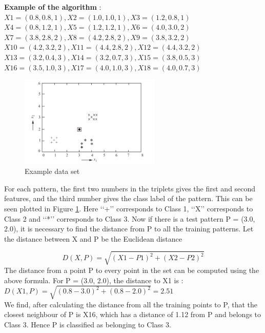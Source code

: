 \vspace{5mm}
\textbf{Example of the algorithm} :\newline 
$ X1 = (0.8, 0.8, 1), X2 = (1.0, 1.0, 1), X3 = (1.2, 0.8, 1)$\\
$X4 = (0.8, 1.2, 1), X5 = (1.2, 1.2, 1), X6 = (4.0, 3.0, 2)$\\
$X7 = (3.8, 2.8, 2), X8 = (4.2, 2.8, 2), X9 = (3.8, 3.2, 2)$\\
$X10 = (4.2, 3.2, 2), X11 = (4.4, 2.8, 2), X12 = (4.4, 3.2, 2)$\\
$X13 = (3.2, 0.4, 3), X14 = (3.2, 0.7, 3), X15 = (3.8, 0.5, 3)$\\
$X16 = (3.5, 1.0, 3), X17 = (4.0, 1.0, 3), X18 = (4.0, 0.7, 3)$

\begin{figure}[H]
\centering
\includegraphics[width=0.6\textwidth]{img/nn-example.PNG}
\caption{ Example data set }
\label{fig:NN}
\end{figure}

For each pattern, the first two numbers in the triplets gives the first and second
features, and the third number gives the class label of the pattern.
This can be seen plotted in Figure \ref{fig:NN}. Here ‘‘+’’ corresponds to Class 1, ‘‘X’’
corresponds to Class 2 and ‘‘*’’ corresponds to Class 3.
Now if there is a test pattern P = (3.0, 2.0), it is necessary to find the distance
from P to all the training patterns.
Let the distance between X and P be the Euclidean distance

$$D(X,P) = \sqrt{(X1 - P1)^{2} + (X2 - P2 )^{2} }$$
\newline
The distance from a point P to every point in the set can be computed using the above formula. For P = (3.0, 2.0), the distance to X1 is :
$D(X1,P) = \sqrt{(0.8 - 3.0)^{2} + (0.8 - 2.0 )^{2} } = 2.51 $ \\
We find, after calculating the distance from all the training points to P, that the closest
neighbour of P is X16, which has a distance of 1.12 from P and belongs to Class 3.
Hence P is classified as belonging to Class 3.
